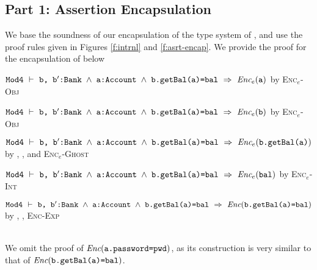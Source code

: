 \subsection{Part 1: Assertion Encapsulation}
\label{s:BA-encap}
We base the soundness of our encapsulation of the type system of \Loo, and use the proof rules given in Figures \ref{f:intrnl} and \ref{f:asrt-encap}.
We provide the proof for the encapsulation of  below\\
\begin{proofexample}
	{\begin{proofexample}
			{\proofstepwithrule
			{${\texttt{Mod4}}\ \vdash\ {\texttt{b, b$^\prime$:Bank $\wedge$ a:Account $\wedge$ b.getBal(a)=bal}}\ \Rightarrow\ \textit{Enc$_e$}({\texttt{a}})$}
				{by \textsc{Enc$_e$-Obj}}
		}
		\endproofsteps
	\end{proofexample}
		}
	{\begin{proofexample}
		\proofsteps{\prg{bEnc}}
			{\proofstepwithrule
			{${\texttt{Mod4}}\ \vdash\ {\texttt{b, b$^\prime$:Bank $\wedge$ a:Account $\wedge$ b.getBal(a)=bal}}\ \Rightarrow\ \textit{Enc$_e$}({\texttt{b}})$}
				{by \textsc{Enc$_e$-Obj}}
		}
		\endproofsteps
	\end{proofexample}
		}
	{\begin{proofexample}
		\proofsteps{\prg{getBalEnc}}
			{\proofstepwithrule
			{${\texttt{Mod4}}\ \vdash\ {\texttt{b, b$^\prime$:Bank $\wedge$ a:Account $\wedge$ b.getBal(a)=bal}}\ \Rightarrow\ \textit{Enc$_e$}({\texttt{b.getBal(a)}})$}
				{by , , and \textsc{Enc$_e$-Ghost}}
		}
		\endproofsteps
	\end{proofexample}
		}
	{\begin{proofexample}
		\proofsteps{\prg{balEnc}}
			{\proofstepwithrule
			{${\texttt{Mod4}}\ \vdash\ {\texttt{b, b$^\prime$:Bank $\wedge$ a:Account $\wedge$ b.getBal(a)=bal}}\ \Rightarrow\ \textit{Enc$_e$}({\texttt{bal}})$}
				{by \textsc{Enc$_e$-Int}}
		}
		\endproofsteps
	\end{proofexample}
		}
		{\proofstepwithrule
			{
			${\texttt{Mod4}}\ \vdash\ {\texttt{b, b$^\prime$:Bank $\wedge$ a:Account $\wedge$ b.getBal(a)=bal}}\ \Rightarrow\ \textit{Enc}({\texttt{b.getBal(a)=bal}})$
			}{by , , \textsc{Enc-Exp}}}
\endproofsteps
\end{proofexample}\\
We omit the proof of $\textit{Enc}({\texttt{a.password=pwd}})$, as its construction is very similar to that of $\textit{Enc}({\texttt{b.getBal(a)=bal}})$.

